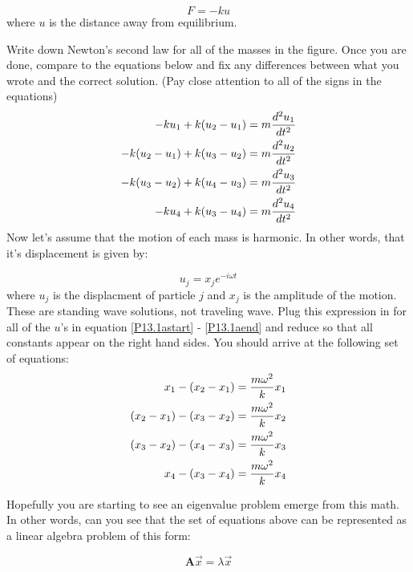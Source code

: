 \begin{equation}
F = - k u
\end{equation}
where $u$ is the distance away from equilibrium.
\begin{enumerate}
\probtwo \label{P:13.1}
\begin{enumerate}
\subprob
 Write down Newton's second law for all of the masses in the figure.
Once you are done, compare to the equations below and fix any
differences between what you wrote and the correct solution. (Pay
close attention to all of the signs in the equations)
\begin{align}
    -k u_1 + k (u_2 - u_1) &= m {d^2u_1\over dt^2}\label{P13.1astart}\\
    -k (u_2 - u_1) + k (u_3 - u_2) &= m {d^2u_2\over dt^2}\\
    -k (u_3 - u_2) + k (u_4 - u_3) &= m {d^2u_3\over dt^2}\\
    -k u_4 + k (u_3 - u_4) &= m {d^2u_4\over dt^2}\label{P13.1aend}
\end{align}
\subprob Now let's assume that the motion of each mass is harmonic.
In other words, that it's displacement is given by:

\begin{equation}
u_j = x_j e^{-i \omega t}
\end{equation}
where $u_j$ is the displacment of particle $j$ and $x_j$ is the
amplitude of the motion. These are standing wave solutions, not
traveling wave. Plug this expression in for all of the $u$'s
in equation \ref{P13.1astart} - \ref{P13.1aend} and reduce so that all constants appear on
the right hand sides.  You should arrive at the following set of
equations:
\begin{align}\label{P13.1b}
     x_1 -  (x_2 - x_1) &= {m\omega^2\over k} x_1\\
     (x_2 - x_1) -  (x_3 - x_2) &= {m\omega^2\over k} x_2\\
     (x_3 - x_2) -  (x_4 - x_3) &= {m\omega^2\over k} x_3\\
     x_4 -  (x_3 - x_4) &= {m\omega^2\over k} x_4\\
\end{align}

\subprob  Hopefully you are starting to see an
eigenvalue problem emerge from this math.  In other words, can you see
that the set of equations above can be represented as a linear algebra
problem of this form:

\begin{equation}
\mathbf{A} \vec{x} = \lambda \vec{x}
\end{equation}


\end{enumerate}
\end{enumerate}
